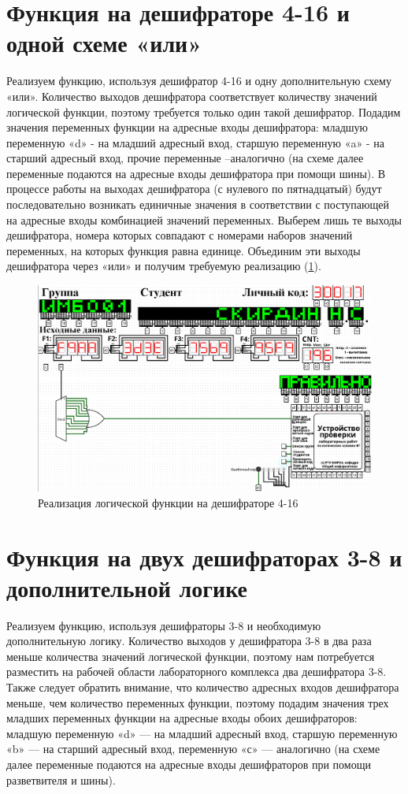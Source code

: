 \documentclass[14pt, a4paper]{extreport}
\begin{document}
\section{Функция на дешифраторе 4-16 и одной схеме «или»}
Реализуем функцию, используя дешифратор 4-16 и одну дополнительную схему «или». Количество выходов дешифратора соответствует количеству значений логической функции, поэтому требуется только один такой дешифратор. Подадим значения переменных функции на адресные входы дешифратора: младшую переменную «d» - на младший адресный вход, старшую переменную «a» - на старший адресный вход, прочие переменные –аналогично (на схеме далее переменные подаются на адресные входы дешифратора при помощи шины). В процессе работы на выходах дешифратора (с нулевого по пятнадцатый) будут последовательно возникать единичные значения в соответствии с поступающей на адресные входы комбинацией значений переменных. Выберем лишь те выходы дешифратора, номера которых совпадают с номерами наборов значений переменных, на которых функция равна единице. Объединим эти выходы дешифратора через «или» и получим требуемую реализацию (\cref{fig:decoder-4-16}).
\begin{figure}[H]
	\caption{Реализация логической функции на дешифраторе 4-16}
	\label{fig:decoder-4-16}
	\includegraphics[width=\textwidth]{decoder-4-16}
\end{figure}

\section{Функция на двух дешифраторах 3-8 и дополнительной логике}
Реализуем функцию, используя дешифраторы 3-8 и необходимую дополнительную логику. Количество выходов у дешифратора 3-8 в два раза меньше количества значений логической функции, поэтому нам потребуется разместить на рабочей области лабораторного комплекса два дешифратора 3-8. Также следует обратить внимание, что количество адресных входов дешифратора меньше, чем количество переменных функции, поэтому подадим значения трех младших переменных функции на адресные входы обоих дешифраторов: младшую переменную «d» — на младший адресный вход, старшую переменную «b» — на старший адресный вход, переменную «с» — аналогично (на схеме далее переменные подаются на адресные входы дешифраторов при помощи разветвителя и шины).
\end{document}
